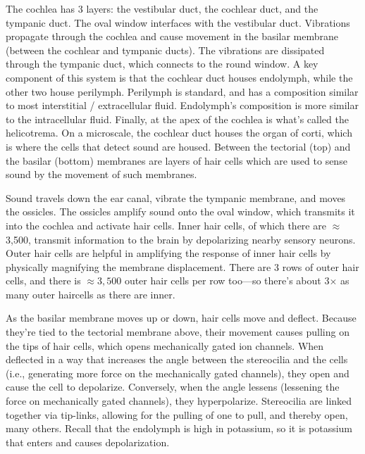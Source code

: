 \documentclass[12pt]{report}
\begin{document}
The cochlea has 3 layers: the vestibular duct, the cochlear duct, and the tympanic duct. The oval window interfaces with the vestibular duct. Vibrations propagate through the cochlea and cause movement in the basilar membrane (between the cochlear and tympanic ducts). The vibrations are dissipated through the tympanic duct, which connects to the round window. A key component of this system is that the cochlear duct houses endolymph, while the other two house perilymph. Perilymph is standard, and has a composition similar to most interstitial / extracellular fluid. Endolymph's composition is more similar to the intracellular fluid. Finally, at the apex of the cochlea is what's called the helicotrema. On a microscale, the cochlear duct houses the organ of corti, which is where the cells that detect sound are housed. Between the tectorial (top) and the basilar (bottom) membranes are layers of hair cells which are used to sense sound by the movement of such membranes.\newline

Sound travels down the ear canal, vibrate the tympanic membrane, and moves the ossicles. The ossicles amplify sound onto the oval window, which transmits it into the cochlea and activate hair cells. Inner hair cells, of which there are $\approx$ 3,500, transmit information to the brain by depolarizing nearby sensory neurons. Outer hair cells are helpful in amplifying the response of inner hair cells by physically magnifying the membrane displacement. There are 3 rows of outer hair cells, and there is $\approx 3,500$ outer hair cells per row too---so there's about 3$\times$ as many outer haircells as there are inner.\newline

As the basilar membrane moves up or down, hair cells move and deflect. Because they're tied to the tectorial membrane above, their movement causes pulling on the tips of hair cells, which opens mechanically gated ion channels. When deflected in a way that increases the angle between the stereocilia and the cells (i.e., generating more force on the mechanically gated channels), they open and cause the cell to depolarize. Conversely, when the angle lessens (lessening the force on mechanically gated channels), they hyperpolarize. Stereocilia are linked together via tip-links, allowing for the pulling of one to pull, and thereby open, many others. Recall that the endolymph is high in potassium, so it is potassium that enters and causes depolarization.\newline
\end{document}
